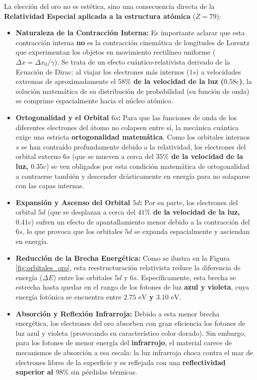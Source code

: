 \documentclass[11pt,a4paper]{book}
\begin{document}
La elección del oro no es estética, sino una consecuencia directa de la \textbf{Relatividad Especial aplicada a la estructura atómica} ($Z = 79$):
\begin{itemize}
    \item \textbf{Naturaleza de la Contracción Interna:} Es importante aclarar que esta contracción interna \textbf{no} es la contracción cinemática de longitudes de Lorentz que experimentan los objetos en movimiento rectilíneo uniforme ($\Delta x = \Delta x_0 / \gamma$). Se trata de un efecto cuántico-relativista derivado de la Ecuación de Dirac: al viajar los electrones más internos ($1s$) a velocidades extremas de aproximadamente el \textbf{$58\%$ de la velocidad de la luz ($0.58c$)}, la solución matemática de su distribución de probabilidad (su función de onda) se comprime espacialmente hacia el núcleo atómico.
    \item \textbf{Ortogonalidad y el Orbital $6s$:} Para que las funciones de onda de los diferentes electrones del átomo no colapsen entre sí, la mecánica cuántica exige una estricta \textbf{ortogonalidad matemática}. Como los orbitales internos $s$ se han contraído profundamente debido a la relatividad, los electrones del orbital externo $6s$ (que se mueven a cerca del \textbf{$35\%$ de la velocidad de la luz, $0.35c$}) se ven obligados por esta condición matemática de ortogonalidad a contraerse también y descender drásticamente en energía para no solaparse con las capas internas.
    \item \textbf{Expansión y Ascenso del Orbital $5d$:} Por su parte, los electrones del orbital $5d$ (que se desplazan a cerca del \textbf{$41\%$ de la velocidad de la luz, $0.41c$}) sufren un efecto de apantallamiento menor debido a la contracción del $6s$, lo que provoca que los orbitales $5d$ se expanda espacialmente y asciendan en energía.
    \item \textbf{Reducción de la Brecha Energética:} Como se ilustra en la Figura \ref{fig:orbitales_oro}, esta reestructuración relativista reduce la diferencia de energía ($\Delta E$) entre los orbitales $5d$ y $6s$. Específicamente, esta brecha se estrecha hasta quedar en el rango de los fotones de luz \textbf{azul y violeta}, cuya energía fotónica se encuentra entre \textbf{$2.75 \text{ eV}$ y $3.10 \text{ eV}$}.
    \item \textbf{Absorción y Reflexión Infrarroja:} Debido a esta menor brecha energética, los electrones del oro absorben con gran eficiencia los fotones de luz azul y violeta (provocando su característico color dorado). Sin embargo, para los fotones de menor energía del \textbf{infrarrojo}, el material carece de mecanismos de absorción a esa escala: la luz infrarroja choca contra el mar de electrones libres de la superficie y es reflejada con una \textbf{reflectividad superior al $98\%$} sin pérdidas térmicas.
\end{itemize}
\end{document}
